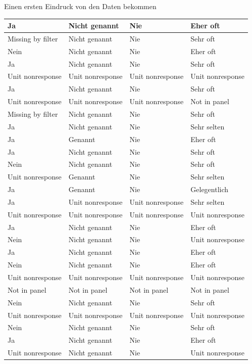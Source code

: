 \documentclass[ignorenonframetext,]{beamer}
\begin{document}
\begin{frame}{Einen ersten Eindruck von den Daten bekommen}
\begin{tabular}{l|l|l|l}
\hline
Ja & Nicht genannt & Nie & Eher oft\\
\hline
Missing by filter & Nicht genannt & Nie & Sehr oft\\
\hline
Nein & Nicht genannt & Nie & Eher oft\\
\hline
Ja & Nicht genannt & Nie & Sehr oft\\
\hline
Unit nonresponse & Unit nonresponse & Unit nonresponse & Unit nonresponse\\
\hline
Ja & Nicht genannt & Nie & Sehr oft\\
\hline
Unit nonresponse & Unit nonresponse & Unit nonresponse & Not in panel\\
\hline
Missing by filter & Nicht genannt & Nie & Sehr oft\\
\hline
Ja & Nicht genannt & Nie & Sehr selten\\
\hline
Ja & Genannt & Nie & Eher oft\\
\hline
Ja & Nicht genannt & Nie & Sehr oft\\
\hline
Nein & Nicht genannt & Nie & Sehr oft\\
\hline
Unit nonresponse & Genannt & Nie & Sehr selten\\
\hline
Ja & Genannt & Nie & Gelegentlich\\
\hline
Ja & Unit nonresponse & Unit nonresponse & Sehr selten\\
\hline
Unit nonresponse & Unit nonresponse & Unit nonresponse & Unit nonresponse\\
\hline
Ja & Nicht genannt & Nie & Eher oft\\
\hline
Nein & Nicht genannt & Nie & Unit nonresponse\\
\hline
Ja & Nicht genannt & Nie & Eher oft\\
\hline
Nein & Nicht genannt & Nie & Eher oft\\
\hline
Unit nonresponse & Unit nonresponse & Unit nonresponse & Unit nonresponse\\
\hline
Not in panel & Not in panel & Not in panel & Not in panel\\
\hline
Nein & Nicht genannt & Nie & Sehr oft\\
\hline
Unit nonresponse & Unit nonresponse & Unit nonresponse & Unit nonresponse\\
\hline
Nein & Nicht genannt & Nie & Sehr oft\\
\hline
Ja & Nicht genannt & Nie & Eher oft\\
\hline
Unit nonresponse & Nicht genannt & Nie & Unit nonresponse\\

\end{tabular}
\end{frame}
\end{document}
